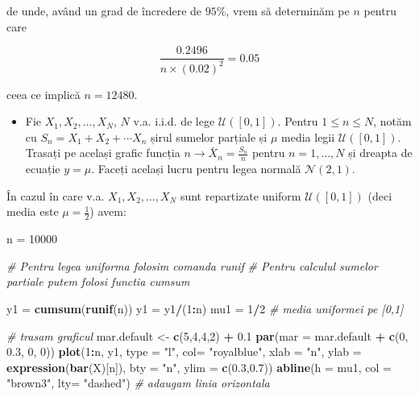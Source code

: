 \documentclass[]{article}
\newenvironment{Shaded}{\begin{snugshade}}{\end{snugshade}}
\newcommand{\KeywordTok}[1]{\textcolor[rgb]{0.13,0.29,0.53}{\textbf{#1}}}
\newcommand{\DataTypeTok}[1]{\textcolor[rgb]{0.13,0.29,0.53}{#1}}
\newcommand{\DecValTok}[1]{\textcolor[rgb]{0.00,0.00,0.81}{#1}}
\newcommand{\FloatTok}[1]{\textcolor[rgb]{0.00,0.00,0.81}{#1}}
\newcommand{\StringTok}[1]{\textcolor[rgb]{0.31,0.60,0.02}{#1}}
\newcommand{\CommentTok}[1]{\textcolor[rgb]{0.56,0.35,0.01}{\textit{#1}}}
\newcommand{\OperatorTok}[1]{\textcolor[rgb]{0.81,0.36,0.00}{\textbf{#1}}}
\newcommand{\NormalTok}[1]{#1}
\newenvironment{frshaded*}{%
  \def\FrameCommand{\fboxrule=\FrameRule\fboxsep=\FrameSep \fcolorbox{framecolor}{shadecolor1}}%
  \MakeFramed {\advance\hsize-\width \FrameRestore}}%
{\endMakeFramed}
\newenvironment{rmdblock}[1]
  {\begin{frshaded*}
  \begin{itemize}
  \renewcommand{\labelitemi}{
    \raisebox{-.7\height}[0pt][0pt]{
      {\setkeys{Gin}{width=2em,keepaspectratio}\texttt{[image: images/icons/\#1]}}
    }
  }
  \item
  }
  {
  \end{itemize}
  \end{frshaded*}
  }
\newenvironment{rmdexercise}
  {\begin{rmdblock}{exercise}}
  {\end{rmdblock}}
\begin{document}
de unde, având un grad de încredere de \(95\%\), vrem să determinăm pe
\(n\) pentru care

\[
  \frac{0.2496}{n\times(0.02)^2} = 0.05
\]

ceea ce implică \(n = 12480\).

\begin{rmdexercise}
Fie \(X_1,X_2,\dots,X_N\), \(N\) v.a. i.i.d. de lege
\(\mathcal{U}([0,1])\). Pentru \(1\leq n\leq N\), notăm cu
\(S_n=X_1+X_2+\cdots X_n\) șirul sumelor parțiale și \(\mu\) media legii
\(\mathcal{U}([0,1])\). Trasați pe același grafic funcția
\(n\to \bar{X}_n=\frac{S_n}{n}\) pentru \(n=1,\dots,N\) și dreapta de
ecuație \(y=\mu\). Faceți același lucru pentru legea normală
\(\mathcal{N}(2,1)\).
\end{rmdexercise}

În cazul în care v.a. \(X_1,X_2,\dots,X_N\) sunt repartizate uniform
\(\mathcal{U}([0,1])\) (deci media este \(\mu=\frac{1}{2}\)) avem:

\begin{Shaded}
\begin{Highlighting}[]
\NormalTok{n =}\StringTok{ }\DecValTok{10000}

\CommentTok{# Pentru legea uniforma folosim comanda runif}
\CommentTok{# Pentru calculul sumelor partiale putem folosi functia cumsum}

\NormalTok{y1 =}\StringTok{ }\KeywordTok{cumsum}\NormalTok{(}\KeywordTok{runif}\NormalTok{(n))}
\NormalTok{y1 =}\StringTok{ }\NormalTok{y1}\OperatorTok{/}\NormalTok{(}\DecValTok{1}\OperatorTok{:}\NormalTok{n)}
\NormalTok{mu1 =}\StringTok{ }\DecValTok{1}\OperatorTok{/}\DecValTok{2} \CommentTok{# media uniformei pe [0,1]}

\CommentTok{# trasam graficul }
\NormalTok{mar.default <-}\StringTok{ }\KeywordTok{c}\NormalTok{(}\DecValTok{5}\NormalTok{,}\DecValTok{4}\NormalTok{,}\DecValTok{4}\NormalTok{,}\DecValTok{2}\NormalTok{) }\OperatorTok{+}\StringTok{ }\FloatTok{0.1}
\KeywordTok{par}\NormalTok{(}\DataTypeTok{mar =}\NormalTok{ mar.default }\OperatorTok{+}\StringTok{ }\KeywordTok{c}\NormalTok{(}\DecValTok{0}\NormalTok{, }\FloatTok{0.3}\NormalTok{, }\DecValTok{0}\NormalTok{, }\DecValTok{0}\NormalTok{)) }
\KeywordTok{plot}\NormalTok{(}\DecValTok{1}\OperatorTok{:}\NormalTok{n, y1, }\DataTypeTok{type =} \StringTok{"l"}\NormalTok{, }
     \DataTypeTok{col=} \StringTok{"royalblue"}\NormalTok{, }\DataTypeTok{xlab =} \StringTok{"n"}\NormalTok{, }
     \DataTypeTok{ylab =} \KeywordTok{expression}\NormalTok{(}\KeywordTok{bar}\NormalTok{(X)[n]), }
     \DataTypeTok{bty =} \StringTok{"n"}\NormalTok{,}
     \DataTypeTok{ylim =} \KeywordTok{c}\NormalTok{(}\FloatTok{0.3}\NormalTok{,}\FloatTok{0.7}\NormalTok{))}
\KeywordTok{abline}\NormalTok{(}\DataTypeTok{h =}\NormalTok{ mu1, }\DataTypeTok{col =} \StringTok{"brown3"}\NormalTok{, }\DataTypeTok{lty=} \StringTok{"dashed"}\NormalTok{) }\CommentTok{# adaugam linia orizontala}
\end{Highlighting}
\end{Shaded}
\end{document}
